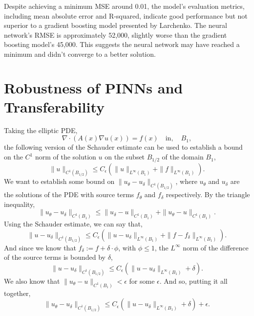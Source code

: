 \documentclass[unicode,11pt,a4paper,oneside,numbers=endperiod,openany]{scrartcl}
\begin{document}
Despite achieving a minimum MSE around 0.01, the model's evaluation metrics,
including mean absolute error and R-squared, indicate good performance but not
superior to a gradient boosting model presented by Larchenko. The neural
network's RMSE is approximately 52,000, slightly worse than the gradient
boosting model's 45,000. This suggests the neural network may have reached a
minimum and didn't converge to a better solution.

\section{Robustness of PINNs and Transferability}\label{sec:task4}
Taking the elliptic PDE,
\begin{equation}
    \nabla \cdot (A(x) \nabla u(x)) = f(x) \quad \text{in} ,\quad B_1,
\end{equation}
the following version of the Schauder estimate can be used to establish a bound
on the $C^1$ norm of the solution $u$ on the subset $B_{1/2}$ of the domain $B_1$,
\begin{equation}
    \|u\|_{C^1(B_{1/2})} \leq C_{\epsilon} (\|u\|_{L^\infty(B_1)} + \|f\|_{L^\infty(B_1)}).
\end{equation}
We want to establish some bound on $\|u_\theta - u_{\delta}\|_{C^1(B_{1/2})}$,
where $u_\theta$ and $u_\delta$ are the solutions of the PDE with source terms
$f_\theta$ and $f_\delta$ respectively.
By the triangle inequality,
\begin{equation}
    \|u_\theta - u_\delta\|_{C^1(B_1)} \leq  \|u_\delta - u \|_{C^1(B_1)} +  \|u_\theta - u \|_{C^1(B_1)}.
\end{equation}
Using the Schauder estimate, we can say that,
\begin{equation}
    \|u - u_\delta\|_{C^1(B_{1/2})} \leq C_{\epsilon} (\|u - u_\delta\|_{L^\infty(B_1)} + \|f - f_\delta\|_{L^\infty(B_1)}).
\end{equation}
And since we know that $f_\delta := f + \delta \cdot \phi$, with $\phi \leq 1$,
the $L^\infty$ norm of the difference of the source terms is bounded by $\delta$, 
\begin{equation}
    \|u - u_\delta\|_{C^1(B_{1/2})} \leq C_{\epsilon} (\|u - u_\delta\|_{L^\infty(B_1)} + \delta).
\end{equation}
We also know that $\|u_\theta - u\|_{C^1(B_1)} < \epsilon$ for some $\epsilon$.
And so, putting it all together,
\begin{equation}
    \|u_\theta - u_\delta\|_{C^1(B_{1/2})} \leq  C_{\epsilon} (\|u - u_\delta\|_{L^\infty(B_1)} + \delta) + \epsilon.
\end{equation}
\end{document}

